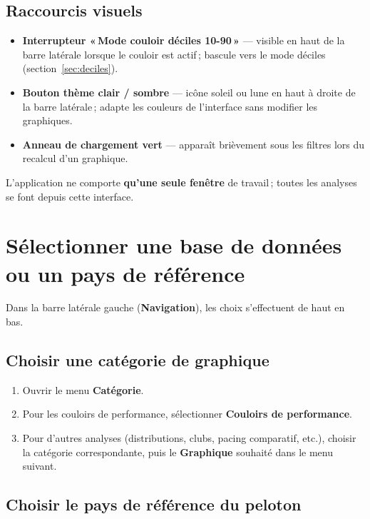 \documentclass[11pt,a4paper]{article}
\begin{document}
\subsection{Raccourcis visuels}

\begin{itemize}
  \item \textbf{Interrupteur «\,Mode couloir déciles 10-90\,»} --- visible en haut de la barre latérale lorsque le couloir est actif\,; bascule vers le mode déciles (section~\ref{sec:deciles}).
  \item \textbf{Bouton thème clair / sombre} --- icône soleil ou lune en haut à droite de la barre latérale\,; adapte les couleurs de l'interface sans modifier les graphiques.
  \item \textbf{Anneau de chargement vert} --- apparaît brièvement sous les filtres lors du recalcul d'un graphique.
\end{itemize}

\noindent L'application ne comporte \textbf{qu'une seule fenêtre} de travail\,; toutes les analyses se font depuis cette interface.

\section{Sélectionner une base de données ou un pays de référence}

Dans la barre latérale gauche (\textbf{Navigation}), les choix s'effectuent de haut en bas.

\subsection{Choisir une catégorie de graphique}

\begin{enumerate}
  \item Ouvrir le menu \textbf{Catégorie}.
  \item Pour les couloirs de performance, sélectionner \textbf{Couloirs de performance}.
  \item Pour d'autres analyses (distributions, clubs, pacing comparatif, etc.), choisir la catégorie correspondante, puis le \textbf{Graphique} souhaité dans le menu suivant.
\end{enumerate}

\subsection{Choisir le pays de référence du peloton}
\end{document}
